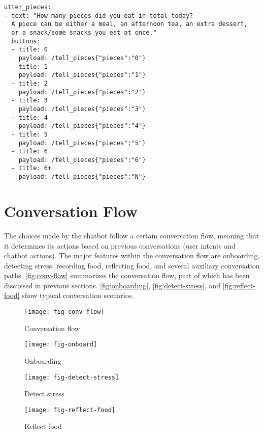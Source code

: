 \begin{lstlisting}
utter_pieces:
- text: "How many pieces did you eat in total today?
  A piece can be either a meal, an afternoon tea, an extra dessert,
  or a snack/some snacks you eat at once."
  buttons:
  - title: 0
    payload: /tell_pieces{"pieces":"0"}
  - title: 1
    payload: /tell_pieces{"pieces":"1"}
  - title: 2
    payload: /tell_pieces{"pieces":"2"}
  - title: 3
    payload: /tell_pieces{"pieces":"3"}
  - title: 4
    payload: /tell_pieces{"pieces":"4"}
  - title: 5
    payload: /tell_pieces{"pieces":"5"}
  - title: 6
    payload: /tell_pieces{"pieces":"6"}
  - title: 6+
    payload: /tell_pieces{"pieces":"N"}
\end{lstlisting}

\section{Conversation Flow} \label{flow}
The choices made by the chatbot follow a certain conversation flow, meaning that it determines its actions based on previous conversations (user intents and chatbot actions). The major features within the conversation flow are onboarding, detecting stress, recording food, reflecting food, and several auxiliary conversation paths. \autoref{fig:conv-flow} summarizes the conversation flow, part of which has been discussed in previous sections. \autoref{fig:onboarding}, \autoref{fig:detect-stress}, and \autoref{fig:reflect-food} show typical conversation scenarios.

\begin{figure}[ht]
  \centering
  \texttt{[image: fig-conv-flow]}
  \caption{Conversation flow}
  \label{fig:conv-flow}
\end{figure}

\begin{figure}[ht]
  \centering
  \texttt{[image: fig-onboard]}
  \caption{Onboarding}
  \label{fig:onboarding}
\end{figure}

\begin{figure}[ht]
  \centering
  \texttt{[image: fig-detect-stress]}
  \caption{Detect stress}
  \label{fig:detect-stress}
\end{figure}

\begin{figure}[ht]
  \centering
  \texttt{[image: fig-reflect-food]}
  \caption{Reflect food}
  \label{fig:reflect-food}
\end{figure}

